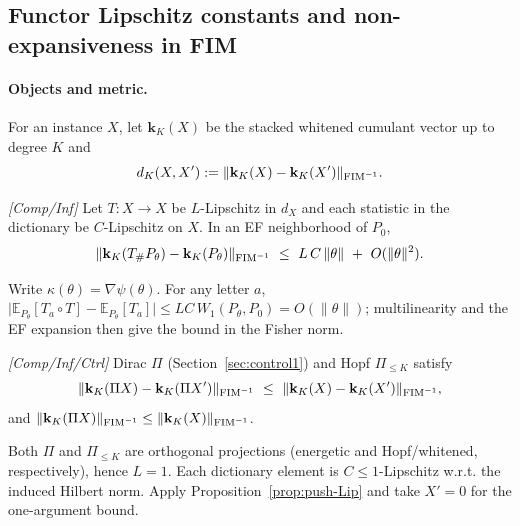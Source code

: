 \subsection{Functor Lipschitz constants and non-expansiveness in FIM}\label{sec:cat}

\paragraph{Objects and metric.}
For an instance $X$, let $\mathbf k_K(X)$ be the stacked whitened cumulant vector up to degree $K$ and
\[
d_K(X,X'):=\|\mathbf k_K(X)-\mathbf k_K(X')\|_{\mathrm{FIM}^{-1}}.
\]

\begin{proposition}\label{prop:push-Lip}
\emph{[\textup{Comp/Inf}]}
Let $T:X\to X$ be $L$-Lipschitz in $d_X$ and each statistic in the dictionary be $C$-Lipschitz on $X$. In an EF neighborhood of $P_0$,
\[
\|\mathbf k_K(T_\# P_\theta)-\mathbf k_K(P_\theta)\|_{\mathrm{FIM}^{-1}}
\ \le\ L\,C\,\|\theta\|\ +\ O(\|\theta\|^2).
\]
\begin{proofsketch}
Write $\kappa(\theta)=\nabla\psi(\theta)$. For any letter $a$, $\big|\mathbb E_{P_\theta}[T_a\!\circ T]-\mathbb E_{P_\theta}[T_a]\big|\le L C\,W_1(P_\theta,P_0)=O(\|\theta\|)$; multilinearity and the EF expansion then give the bound in the Fisher norm.
\end{proofsketch}
\end{proposition}

\begin{lemma}\label{lem:nonexpansive-12}
\emph{[\textup{Comp/Inf/Ctrl}]}
Dirac $\Pi$ (Section~\ref{sec:control1}) and Hopf $\Pi_{\le K}$ satisfy
\[
\|\mathbf k_K(\Pi X)-\mathbf k_K(\Pi X')\|_{\mathrm{FIM}^{-1}}\ \le\ \|\mathbf k_K(X)-\mathbf k_K(X')\|_{\mathrm{FIM}^{-1}},
\]
and $\|\mathbf k_K(\Pi X)\|_{\mathrm{FIM}^{-1}}\le \|\mathbf k_K(X)\|_{\mathrm{FIM}^{-1}}$.
\begin{proofsketch}
Both $\Pi$ and $\Pi_{\le K}$ are orthogonal projections (energetic and Hopf/whitened, respectively), hence $L=1$. Each dictionary element is $C\le 1$-Lipschitz w.r.t. the induced Hilbert norm. Apply Proposition~\ref{prop:push-Lip} and take $X'=0$ for the one-argument bound.
\end{proofsketch}
\end{lemma}

